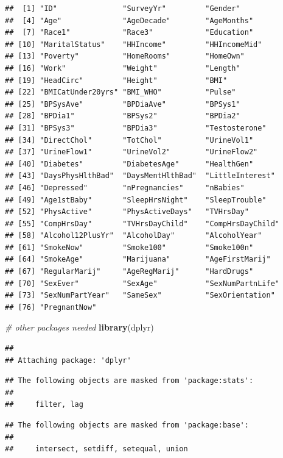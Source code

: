 \documentclass[]{article}
\newenvironment{Shaded}{\begin{snugshade}}{\end{snugshade}}
\newcommand{\KeywordTok}[1]{\textcolor[rgb]{0.13,0.29,0.53}{\textbf{{#1}}}}
\newcommand{\CommentTok}[1]{\textcolor[rgb]{0.56,0.35,0.01}{\textit{{#1}}}}
\newcommand{\NormalTok}[1]{{#1}}
\begin{document}
\begin{verbatim}
##  [1] "ID"               "SurveyYr"         "Gender"          
##  [4] "Age"              "AgeDecade"        "AgeMonths"       
##  [7] "Race1"            "Race3"            "Education"       
## [10] "MaritalStatus"    "HHIncome"         "HHIncomeMid"     
## [13] "Poverty"          "HomeRooms"        "HomeOwn"         
## [16] "Work"             "Weight"           "Length"          
## [19] "HeadCirc"         "Height"           "BMI"             
## [22] "BMICatUnder20yrs" "BMI_WHO"          "Pulse"           
## [25] "BPSysAve"         "BPDiaAve"         "BPSys1"          
## [28] "BPDia1"           "BPSys2"           "BPDia2"          
## [31] "BPSys3"           "BPDia3"           "Testosterone"    
## [34] "DirectChol"       "TotChol"          "UrineVol1"       
## [37] "UrineFlow1"       "UrineVol2"        "UrineFlow2"      
## [40] "Diabetes"         "DiabetesAge"      "HealthGen"       
## [43] "DaysPhysHlthBad"  "DaysMentHlthBad"  "LittleInterest"  
## [46] "Depressed"        "nPregnancies"     "nBabies"         
## [49] "Age1stBaby"       "SleepHrsNight"    "SleepTrouble"    
## [52] "PhysActive"       "PhysActiveDays"   "TVHrsDay"        
## [55] "CompHrsDay"       "TVHrsDayChild"    "CompHrsDayChild" 
## [58] "Alcohol12PlusYr"  "AlcoholDay"       "AlcoholYear"     
## [61] "SmokeNow"         "Smoke100"         "Smoke100n"       
## [64] "SmokeAge"         "Marijuana"        "AgeFirstMarij"   
## [67] "RegularMarij"     "AgeRegMarij"      "HardDrugs"       
## [70] "SexEver"          "SexAge"           "SexNumPartnLife" 
## [73] "SexNumPartYear"   "SameSex"          "SexOrientation"  
## [76] "PregnantNow"
\end{verbatim}

\begin{Shaded}
\begin{Highlighting}[]
\CommentTok{# other packages needed}
\KeywordTok{library}\NormalTok{(dplyr)}
\end{Highlighting}
\end{Shaded}

\begin{verbatim}
## 
## Attaching package: 'dplyr'
\end{verbatim}

\begin{verbatim}
## The following objects are masked from 'package:stats':
## 
##     filter, lag
\end{verbatim}

\begin{verbatim}
## The following objects are masked from 'package:base':
## 
##     intersect, setdiff, setequal, union
\end{verbatim}
\end{document}
